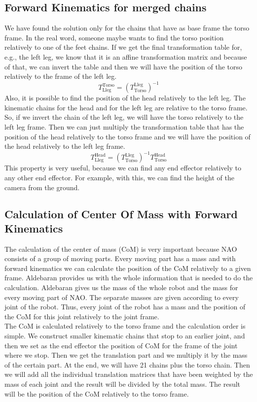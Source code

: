 \subsection{Forward Kinematics for merged chains}
We have found the solution only for the chains that have as base frame the torso frame. In the real word, someone maybe wants to find the torso position relatively to one of the feet chains. If we get the final transformation table for, e.g., the left leg, we know that it is an affine transformation matrix and because of that, we can invert the table and then we will have the position of the torso relatively to the frame of the left leg. 
\[
T^\text{Torso}_\text{Lleg} = {\left(T^\text{Lleg}_\text{Torso}\right)}^{-1}
\]
Also, it is possible to find the position of the head relatively to the left leg. The kinematic chains for the head and for the left leg are relative to the torso frame. So, if we invert the chain of the left leg, we will have the torso relatively to the left leg frame. Then we can just multiply the transformation table that has the position of the head relatively to the torso frame and we will have the position of the head relatively to the left leg frame.
\[
T^\text{Head}_\text{Lleg} = {\left(T^\text{Lleg}_\text{Torso}\right)}^{-1}T^\text{Head}_\text{Torso}
\]
This property is very useful, because we can find any end effector relatively to any other end effector. For example, with this, we can find the height of the camera from the ground.

\subsection{Calculation of Center Of Mass with Forward Kinematics}
The calculation of the center of mass (CoM) is very important because NAO consists of a group of moving parts. Every moving part has a mass and with forward kinematics we can calculate the position of the CoM relatively to a given frame. Aldebaran provides us with the whole information that is needed to do the calculation. Aldebaran gives us the mass of the whole robot and the mass for every moving part of NAO. The separate masses are given according to every joint of the robot. Thus, every joint of the robot has a mass and the position of the CoM for this joint relatively to the joint frame.\\
The CoM is calculated relatively to the torso frame and the calculation order is simple. We construct smaller kinematic chains that stop to an earlier joint, and then we set as the end effector the position of CoM for the frame of the joint where we stop. Then we get the translation part and we multiply it by the mass of the certain part. At the end, we will have 21 chains plus the torso chain. Then we will add all the individual translation matrices that have been weighted by the mass of each joint and the result will be divided by the total mass. The result will be the position of the CoM relatively to the torso frame.



